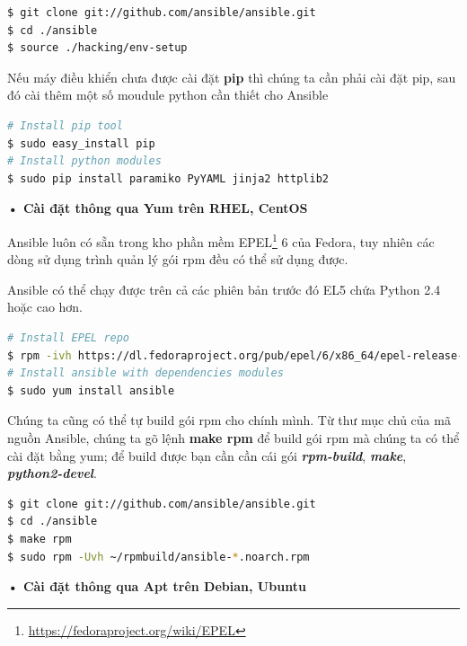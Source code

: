 \begin{lstlisting}[label={lst:ansible_install_from_source},caption={Cài đặt Ansible từ mã nguồn}, language=bash, deletekeywords={env}]
$ git clone git://github.com/ansible/ansible.git
$ cd ./ansible
$ source ./hacking/env-setup
\end{lstlisting}

Nếu máy điều khiển chưa được cài đặt \textbf{pip} thì chúng ta cần phải cài đặt pip, sau đó cài thêm một số moudule python cần thiết cho Ansible

\begin{lstlisting}[label={lst:ansible_install_module_pip},caption={Cài đặt các module cần thiết cho Ansible bằng pip}, language=bash, deletekeywords={}]
# Install pip tool
$ sudo easy_install pip
# Install python modules
$ sudo pip install paramiko PyYAML jinja2 httplib2
\end{lstlisting}

\textbf{• Cài đặt thông qua Yum trên RHEL, CentOS}

Ansible luôn có sẵn trong kho phần mềm EPEL\footnote{\url{https://fedoraproject.org/wiki/EPEL}} 6 của Fedora, tuy nhiên các dòng sử dụng trình quản lý gói rpm đều có thể sử dụng được.

Ansible có thể chạy được trên cả các phiên bản trước đó EL5 chứa Python 2.4 hoặc cao hơn.

\begin{lstlisting}[label={lst:ansible_install_yum},caption={Cài đặt Ansible từ mã nguồn}, language=bash, deletekeywords={}]
# Install EPEL repo
$ rpm -ivh https://dl.fedoraproject.org/pub/epel/6/x86_64/epel-release-6-8.noarch.rpm
# Install ansible with dependencies modules
$ sudo yum install ansible
\end{lstlisting}

Chúng ta cũng có thể tự build gói rpm cho chính mình. Từ thư mục chủ của mã nguồn Ansible, chúng ta gõ lệnh \textbf{make rpm} để build gói rpm mà chúng ta có thể cài đặt bằng yum; để build được bạn cần cần cái gói \textbf{\textit{rpm-build}}, \textbf{\textit{make}}, \textbf{\textit{python2-devel}}.

\begin{lstlisting}[label={lst:ansible_install_build_rpm},caption={Tự build gói rpm của Ansible}, language=bash, deletekeywords={}]
$ git clone git://github.com/ansible/ansible.git
$ cd ./ansible
$ make rpm
$ sudo rpm -Uvh ~/rpmbuild/ansible-*.noarch.rpm
\end{lstlisting}

\textbf{• Cài đặt thông qua Apt trên Debian, Ubuntu}


